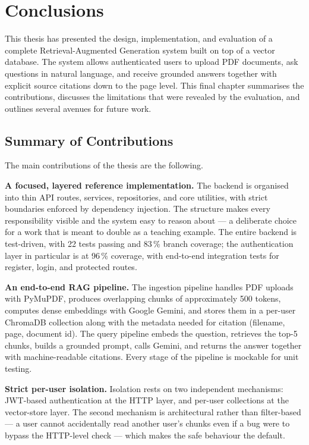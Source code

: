 \chapter{Conclusions}
\label{chap:conclusions}

This thesis has presented the design, implementation, and evaluation of a
complete Retrieval-Augmented Generation system built on top of a vector
database. The system allows authenticated users to upload PDF documents,
ask questions in natural language, and receive grounded answers together
with explicit source citations down to the page level. This final chapter
summarises the contributions, discusses the limitations that were revealed
by the evaluation, and outlines several avenues for future work.

\section{Summary of Contributions}
\label{sec:summary-contributions}

The main contributions of the thesis are the following.

\textbf{A focused, layered reference implementation.} The backend is
organised into thin API routes, services, repositories, and core utilities,
with strict boundaries enforced by dependency injection. The structure
makes every responsibility visible and the system easy to reason about ---
a deliberate choice for a work that is meant to double as a teaching
example. The entire backend is test-driven, with 22 tests passing and
83\,\% branch coverage; the authentication layer in particular is at
96\,\% coverage, with end-to-end integration tests for register, login,
and protected routes.

\textbf{An end-to-end RAG pipeline.} The ingestion pipeline handles PDF
uploads with PyMuPDF, produces overlapping chunks of approximately 500
tokens, computes dense embeddings with Google Gemini, and stores them in
a per-user ChromaDB collection along with the metadata needed for
citation (filename, page, document id). The query pipeline embeds the
question, retrieves the top-5 chunks, builds a grounded prompt, calls
Gemini, and returns the answer together with machine-readable citations.
Every stage of the pipeline is mockable for unit testing.

\textbf{Strict per-user isolation.} Isolation rests on two independent
mechanisms: JWT-based authentication at the HTTP layer, and per-user
collections at the vector-store layer. The second mechanism is
architectural rather than filter-based --- a user cannot accidentally
read another user's chunks even if a bug were to bypass the HTTP-level
check --- which makes the safe behaviour the default.


